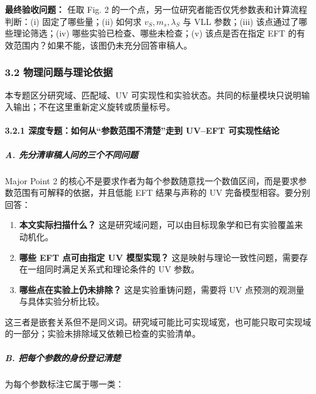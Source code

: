\documentclass[
]{article}
\providecommand{\tightlist}{%
  \setlength{\itemsep}{0pt}\setlength{\parskip}{0pt}}
\begin{document}
\textbf{最终验收问题：} 任取 Fig. 2
的一个点，另一位研究者能否仅凭参数表和计算流程判断：(i)
固定了哪些量；(ii) 如何求 \(v_S,m_s,\lambda_S\) 与 VLL 参数；(iii)
该点通过了哪些理论筛选；(iv) 哪些实验已检查、哪些未检查；(v)
该点是否在指定 EFT 的有效范围内？如果不能，该图仍未充分回答审稿人。

\subsubsection{3.2
物理问题与理论依据}\label{ux7269ux7406ux95eeux9898ux4e0eux7406ux8bbaux4f9dux636e-1}

本专题区分研究域、匹配域、UV
可实现性和实验状态。共同的标量模块只说明输入输出；不在这里重新定义旋转或质量标号。

\paragraph{3.2.1 深度专题：如何从``参数范围不清楚''走到 UV--EFT
可实现性结论}\label{ux6df1ux5ea6ux4e13ux9898ux5982ux4f55ux4eceux53c2ux6570ux8303ux56f4ux4e0dux6e05ux695aux8d70ux5230-uveft-ux53efux5b9eux73b0ux6027ux7ed3ux8bba}

\subparagraph{A.
先分清审稿人问的三个不同问题}\label{a.-ux5148ux5206ux6e05ux5ba1ux7a3fux4ebaux95eeux7684ux4e09ux4e2aux4e0dux540cux95eeux9898}

Major Point 2
的核心不是要求作者为每个参数随意找一个数值区间，而是要求参数范围有可解释的依据，并且低能
EFT 结果与声称的 UV 完备模型相容。要分别回答：

\begin{enumerate}
\def\labelenumi{\arabic{enumi}.}
\tightlist
\item
  \textbf{本文实际扫描什么？}
  这是研究域问题，可以由目标现象学和已有实验覆盖来动机化。
\item
  \textbf{哪些 EFT 点可由指定 UV 模型实现？}
  这是映射与理论一致性问题，需要存在一组同时满足关系式和理论条件的 UV
  参数。
\item
  \textbf{哪些点在实验上仍未排除？} 这是实验重铸问题，需要将 UV
  点预测的观测量与具体实验分析比较。
\end{enumerate}

这三者是嵌套关系但不是同义词。研究域可能比可实现域宽，也可能只取可实现域的一部分；实验未排除域又依赖已检查的实验清单。

\subparagraph{B.
把每个参数的身份登记清楚}\label{b.-ux628aux6bcfux4e2aux53c2ux6570ux7684ux8eabux4efdux767bux8bb0ux6e05ux695a}

为每个参数标注它属于哪一类：
\end{document}

